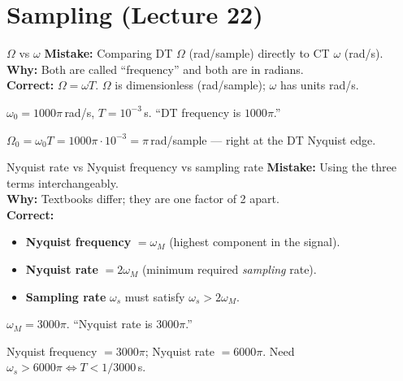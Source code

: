 \documentclass[11pt]{article}
\begin{document}
\section{Sampling (Lecture 22)}

\begin{pitfallbox}{$\Omega$ vs $\omega$}
\textbf{Mistake:} Comparing DT $\Omega$ (rad/sample) directly to CT $\omega$ (rad/s).\\
\textbf{Why:} Both are called ``frequency'' and both are in radians.\\
\textbf{Correct:} $\Omega = \omega T$. $\Omega$ is dimensionless (rad/sample); $\omega$ has units rad/s.
\begin{wrongbox}
$\omega_0 = 1000\pi$\,rad/s, $T = 10^{-3}$\,s. ``DT frequency is $1000\pi$.''
\end{wrongbox}
\begin{rightbox}
$\Omega_0 = \omega_0 T = 1000\pi \cdot 10^{-3} = \pi$\,rad/sample --- right at the DT Nyquist edge.
\end{rightbox}
\end{pitfallbox}

\begin{pitfallbox}{Nyquist rate vs Nyquist frequency vs sampling rate}
\textbf{Mistake:} Using the three terms interchangeably.\\
\textbf{Why:} Textbooks differ; they are one factor of 2 apart.\\
\textbf{Correct:}
\begin{itemize}[leftmargin=1.5em,nosep]
\item \textbf{Nyquist frequency} $= \omega_M$ (highest component in the signal).
\item \textbf{Nyquist rate} $= 2\omega_M$ (minimum required \emph{sampling} rate).
\item \textbf{Sampling rate} $\omega_s$ must satisfy $\omega_s > 2\omega_M$.
\end{itemize}
\begin{wrongbox}
$\omega_M = 3000\pi$. ``Nyquist rate is $3000\pi$.''
\end{wrongbox}
\begin{rightbox}
Nyquist frequency $= 3000\pi$; Nyquist rate $= 6000\pi$. Need $\omega_s > 6000\pi \Leftrightarrow T < 1/3000$\,s.
\end{rightbox}
\end{pitfallbox}
\end{document}

